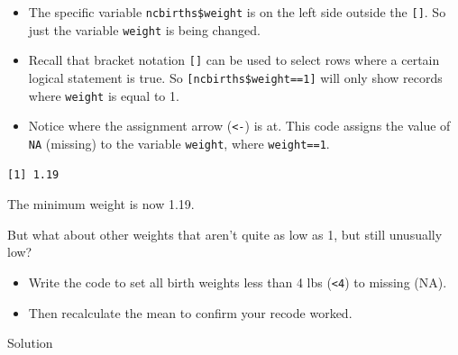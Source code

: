 \documentclass[
  letterpaper,
  DIV=11,
  numbers=noendperiod,
  oneside]{scrreprt}
\newenvironment{Shaded}{\begin{snugshade}}{\end{snugshade}}
\newcommand{\AttributeTok}[1]{\textcolor[rgb]{0.40,0.45,0.13}{#1}}
\newcommand{\ConstantTok}[1]{\textcolor[rgb]{0.56,0.35,0.01}{#1}}
\newcommand{\DecValTok}[1]{\textcolor[rgb]{0.68,0.00,0.00}{#1}}
\newcommand{\FunctionTok}[1]{\textcolor[rgb]{0.28,0.35,0.67}{#1}}
\newcommand{\NormalTok}[1]{\textcolor[rgb]{0.00,0.23,0.31}{#1}}
\newcommand{\OtherTok}[1]{\textcolor[rgb]{0.00,0.23,0.31}{#1}}
\newcommand{\SpecialCharTok}[1]{\textcolor[rgb]{0.37,0.37,0.37}{#1}}
\providecommand{\tightlist}{%
  \setlength{\itemsep}{0pt}\setlength{\parskip}{0pt}}\usepackage{longtable,booktabs,array}
\begin{document}
\begin{itemize}
\tightlist
\item
  The specific variable \texttt{ncbirths\$weight} is on the left side
  outside the \texttt{{[}{]}}. So just the variable \texttt{weight} is
  being changed.
\item
  Recall that bracket notation \texttt{{[}{]}} can be used to select
  rows where a certain logical statement is true. So
  \texttt{{[}ncbirths\$weight==1{]}} will only show records where
  \texttt{weight} is equal to 1.
\item
  Notice where the assignment arrow (\texttt{\textless{}-}) is at. This
  code assigns the value of \texttt{NA} (missing) to the variable
  \texttt{weight}, where \texttt{weight==1}.
\end{itemize}

\begin{Shaded}
\end{Shaded}

\begin{verbatim}
[1] 1.19
\end{verbatim}

The minimum weight is now 1.19.

\begin{tcolorbox}[enhanced jigsaw, bottomrule=.15mm, colback=white, colframe=quarto-callout-tip-color-frame, toprule=.15mm, coltitle=black, rightrule=.15mm, opacitybacktitle=0.6, colbacktitle=quarto-callout-tip-color!10!white, toptitle=1mm, leftrule=.75mm, breakable, bottomtitle=1mm, titlerule=0mm, title={👉 Your Turn}, arc=.35mm, left=2mm, opacityback=0]

But what about other weights that aren't quite as low as 1, but still
unusually low?

\begin{itemize}
\tightlist
\item
  Write the code to set all birth weights less than 4 lbs
  (\texttt{\textless{}4}) to missing (NA).
\item
  Then recalculate the mean to confirm your recode worked.
\end{itemize}

Solution

\begin{Shaded}
\end{Shaded}

\end{tcolorbox}
\end{document}
